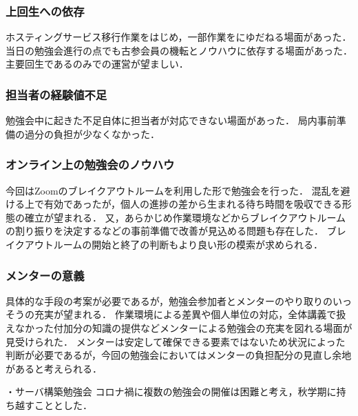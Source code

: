 \subsubsection*{上回生への依存}
ホスティングサービス移行作業をはじめ，一部作業を\fourthGrade{}にゆだねる場面があった．
当日の勉強会進行の点でも古参会員の機転とノウハウに依存する場面があった．主要回生である\secondGrade{}のみでの運営が望ましい．
\subsubsection*{担当者の経験値不足}
勉強会中に起きた不足自体に担当者が対応できない場面があった．
局内事前準備の過分の負担が少なくなかった．
\subsubsection*{オンライン上の勉強会のノウハウ}
今回はZoomのブレイクアウトルームを利用した形で勉強会を行った．
混乱を避ける上で有効であったが，個人の進捗の差から生まれる待ち時間を吸収できる形態の確立が望まれる．
又，あらかじめ作業環境などからブレイクアウトルームの割り振りを決定するなどの事前準備で改善が見込める問題も存在した．
ブレイクアウトルームの開始と終了の判断もより良い形の模索が求められる．
\subsubsection*{メンターの意義}
具体的な手段の考案が必要であるが，勉強会参加者とメンターのやり取りのいっそうの充実が望まれる．
作業環境による差異や個人単位の対応，全体講義で扱えなかった付加分の知識の提供などメンターによる勉強会の充実を図れる場面が見受けられた．
メンターは安定して確保できる要素ではないため状況によった判断が必要であるが，今回の勉強会においてはメンターの負担配分の見直し余地があると考えられる．

・サーバ構築勉強会
コロナ禍に複数の勉強会の開催は困難と考え，秋学期に持ち越すこととした．

